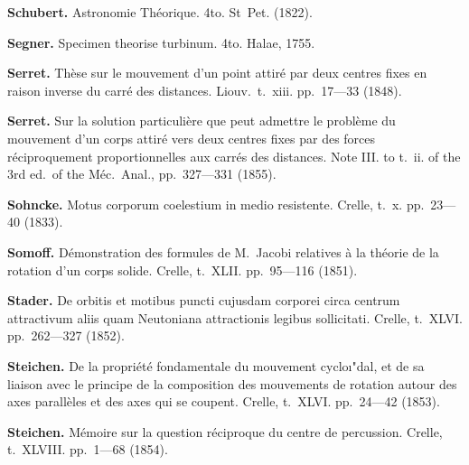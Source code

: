 \documentclass[12pt,a4paper]{article}
\theoremstyle{definition}
\begin{document}
\vspace{0.5em}

\noindent\textbf{Schubert.} Astronomie Th\'{e}orique. 4to. St~Pet. (1822).

\vspace{0.5em}

\noindent\textbf{Segner.} Specimen theorise turbinum. 4to. Halae, 1755.

\vspace{0.5em}

\noindent\textbf{Serret.} Th\`{e}se sur le mouvement d'un point attir\'{e} par deux centres fixes en raison inverse du carr\'{e} des distances. Liouv.~t.~xiii. pp.~17---33 (1848).

\vspace{0.5em}

\noindent\textbf{Serret.} Sur la solution particuli\`{e}re que peut admettre le probl\`{e}me du mouvement d'un corps attir\'{e} vers deux centres fixes par des forces r\'{e}ciproquement proportionnelles aux carr\'{e}s des distances. Note III. to t.~ii. of the 3rd ed.~of the M\'{e}c.~Anal., pp.~327---331 (1855).

\vspace{0.5em}

\noindent\textbf{Sohncke.} Motus corporum coelestium in medio resistente. Crelle, t.~x. pp.~23---40 (1833).

\vspace{0.5em}

\noindent\textbf{Somoff.} D\'{e}monstration des formules de M.~Jacobi relatives \`{a} la th\'{e}orie de la rotation d'un corps solide. Crelle, t.~XLII. pp.~95---116 (1851).

\vspace{0.5em}

\noindent\textbf{Stader.} De orbitis et motibus puncti cujusdam corporei circa centrum attractivum aliis quam Neutoniana attractionis legibus sollicitati. Crelle, t.~XLVI. pp.~262---327 (1852).

\vspace{0.5em}

\noindent\textbf{Steichen.} De la propri\'{e}t\'{e} fondamentale du mouvement cyclo\i"{d}al, et de sa liaison avec le principe de la composition des mouvements de rotation autour des axes parall\`{e}les et des axes qui se coupent. Crelle, t.~XLVI. pp.~24---42 (1853).

\vspace{0.5em}

\noindent\textbf{Steichen.} M\'{e}moire sur la question r\'{e}ciproque du centre de percussion. Crelle, t.~XLVIII. pp.~1---68 (1854).
\end{document}
